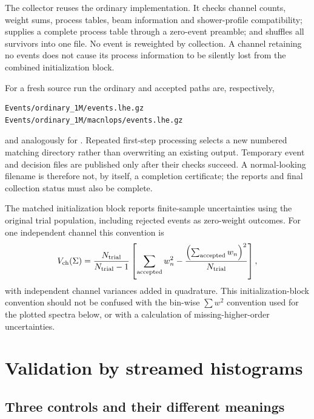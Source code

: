 The collector reuses the ordinary
implementation.  It checks channel counts, weight sums, process
tables, beam information and shower-profile compatibility; supplies a
complete process table through a zero-event preamble; and shuffles all
survivors into one file.  No event is reweighted by collection.  A
channel retaining no events does not cause its process information to
be silently lost from the combined initialization block.

For a fresh source run the ordinary and accepted paths are, respectively,
\begin{verbatim}
Events/ordinary_1M/events.lhe.gz
Events/ordinary_1M/macnlops/events.lhe.gz
\end{verbatim}
and analogously for .  Repeated first-step
processing selects a new numbered matching directory rather than
overwriting an existing output.  Temporary event and decision files
are published only after their checks succeed.  A normal-looking
filename is therefore not, by itself, a completion certificate;
the reports and final collection status must also be complete.

The matched initialization block reports finite-sample uncertainties
using the original trial population, including rejected events as
zero-weight outcomes.  For one independent channel this convention is
\begin{equation}
 V_{\rm ch}(\Sigma)
 = \frac{N_{\rm trial}}{N_{\rm trial}-1}
 \left[
 \sum_{\rm accepted}w_n^2
 -\frac{\left(\sum_{\rm accepted}w_n\right)^2}{N_{\rm trial}}
 \right],
 \label{eq:impl-collection-error}
\end{equation}
with independent channel variances added in quadrature.  This
initialization-block convention should not be confused with the
bin-wise \(\sum w^2\) convention used for the plotted spectra below,
or with a calculation of missing-higher-order uncertainties.

\section{Validation by streamed histograms}
\label{sec:impl-validation}

\subsection{Three controls and their different meanings}
\label{sec:impl-controls}

